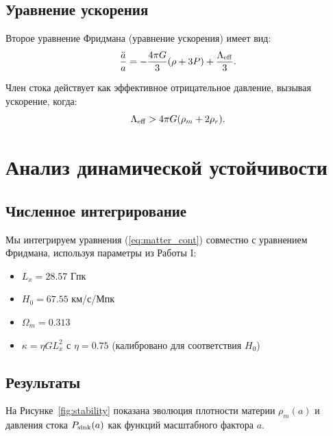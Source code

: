 \documentclass[12pt,a4paper]{article}
\begin{document}
\subsection{Уравнение ускорения}

Второе уравнение Фридмана (уравнение ускорения) имеет вид:
\begin{equation}
\frac{\ddot{a}}{a} = -\frac{4\pi G}{3}(\rho + 3P) + \frac{\Lambda_{\rm eff}}{3}.
\end{equation}

Член стока действует как эффективное отрицательное давление, вызывая ускорение, когда:
\begin{equation}
\Lambda_{\rm eff} > 4\pi G (\rho_m + 2\rho_r).
\end{equation}

\section{Анализ динамической устойчивости}

\subsection{Численное интегрирование}

Мы интегрируем уравнения (\ref{eq:matter_cont}) совместно с уравнением Фридмана, используя параметры из Работы I:
\begin{itemize}
    \item $L_x = 28.57$ Гпк
    \item $H_0 = 67.55$ км/с/Мпк
    \item $\Omega_m = 0.313$
    \item $\kappa = \eta G L_x^2$ с $\eta = 0.75$ (калибровано для соответствия $H_0$)
\end{itemize}

\subsection{Результаты}

На Рисунке~\ref{fig:stability} показана эволюция плотности материи $\rho_m(a)$ и давления стока $P_{\rm sink}(a)$ как функций масштабного фактора $a$.
\end{document}

